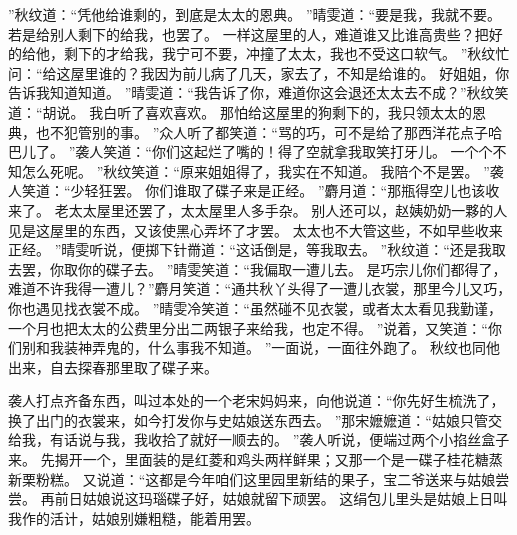 ”秋纹道：“凭他给谁剩的，到底是太太的恩典。
”晴雯道：“要是我，我就不要。
若是给别人剩下的给我，也罢了。
一样这屋里的人，难道谁又比谁高贵些？把好的给他，剩下的才给我，我宁可不要，冲撞了太太，我也不受这口软气。
”秋纹忙问：“给这屋里谁的？我因为前儿病了几天，家去了，不知是给谁的。
好姐姐，你告诉我知道知道。
”晴雯道：“我告诉了你，难道你这会退还太太去不成？”秋纹笑道：“胡说。
我白听了喜欢喜欢。
那怕给这屋里的狗剩下的，我只领太太的恩典，也不犯管别的事。
”众人听了都笑道：“骂的巧，可不是给了那西洋花点子哈巴儿了。
”袭人笑道：“你们这起烂了嘴的！得了空就拿我取笑打牙儿。
一个个不知怎么死呢。
”秋纹笑道：“原来姐姐得了，我实在不知道。
我陪个不是罢。
”袭人笑道：“少轻狂罢。
你们谁取了碟子来是正经。
”麝月道：“那瓶得空儿也该收来了。
老太太屋里还罢了，太太屋里人多手杂。
别人还可以，赵姨奶奶一夥的人见是这屋里的东西，又该使黑心弄坏了才罢。
太太也不大管这些，不如早些收来正经。
”晴雯听说，便掷下针黹道：“这话倒是，等我取去。
”秋纹道：“还是我取去罢，你取你的碟子去。
”晴雯笑道：“我偏取一遭儿去。
是巧宗儿你们都得了，难道不许我得一遭儿？”麝月笑道：“通共秋丫头得了一遭儿衣裳，那里今儿又巧，你也遇见找衣裳不成。
”晴雯冷笑道：“虽然碰不见衣裳，或者太太看见我勤谨，一个月也把太太的公费里分出二两银子来给我，也定不得。
”说着，又笑道：“你们别和我装神弄鬼的，什么事我不知道。
”一面说，一面往外跑了。
秋纹也同他出来，自去探春那里取了碟子来。
\par
袭人打点齐备东西，叫过本处的一个老宋妈妈来，向他说道：“你先好生梳洗了，换了出门的衣裳来，如今打发你与史姑娘送东西去。
”那宋嬷嬷道：“姑娘只管交给我，有话说与我，我收拾了就好一顺去的。
”袭人听说，便端过两个小掐丝盒子来。
先揭开一个，里面装的是红菱和鸡头两样鲜果；又那一个是一碟子桂花糖蒸新栗粉糕。
又说道：“这都是今年咱们这里园里新结的果子，宝二爷送来与姑娘尝尝。
再前日姑娘说这玛瑙碟子好，姑娘就留下顽罢。
这绢包儿里头是姑娘上日叫我作的活计，姑娘别嫌粗糙，能着用罢。
